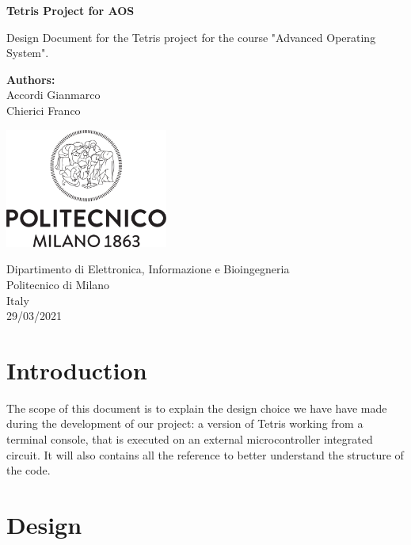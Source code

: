 \documentclass{article}
\begin{document}
\begin{titlepage}
    \begin{center}
       \vspace*{4cm}

       \textbf{\LARGE Tetris Project for AOS}

       \vspace{1.5cm}
        Design Document for the Tetris project for the course "Advanced Operating System".
            
       \vfill

       \textbf{Authors:}\\
       Accordi Gianmarco\\
       Chierici Franco

       \vspace{0.8cm}
     
       \includegraphics[width=0.4\textwidth]{img/Logo_Politecnico_Milano.png}
            
       Dipartimento di Elettronica, Informazione e Bioingegneria\\
       Politecnico di Milano\\
       Italy\\
       29/03/2021
            
   \end{center}
\end{titlepage}

\tableofcontents

\newpage

\section{Introduction}
The scope of this document is to explain the design choice we have have made during the development of our project: a version of Tetris working from a terminal console, that is executed on an external microcontroller integrated circuit. 
It will also contains all the reference to better understand the structure of the code.

\section{Design}
\end{document}
